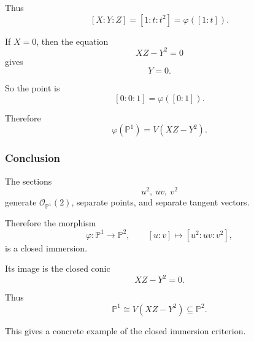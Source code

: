 \documentclass[12pt,a4paper]{article}
\theoremstyle{notespace}
\begin{document}
Thus
\[
[X:Y:Z]=[1:t:t^2]=\varphi([1:t]).
\]

If \(X=0\), then the equation
\[
XZ-Y^2=0
\]
gives
\[
Y=0.
\]

So the point is
\[
[0:0:1]=\varphi([0:1]).
\]

Therefore
\[
\varphi(\mathbb P^1)=V(XZ-Y^2).
\]

\subsubsection*{Conclusion}

The sections
\[
u^2,\ uv,\ v^2
\]
generate \(\mathcal O_{\mathbb P^1}(2)\), separate points, and separate
tangent vectors.

Therefore the morphism
\[
\varphi:\mathbb P^1\to\mathbb P^2,
\qquad
[u:v]\mapsto [u^2:uv:v^2],
\]
is a closed immersion.

Its image is the closed conic
\[
XZ-Y^2=0.
\]

Thus
\[
\boxed{
	\mathbb P^1
	\cong
	V(XZ-Y^2)
	\subseteq
	\mathbb P^2.
}
\]

This gives a concrete example of the closed immersion criterion.
\end{document}
